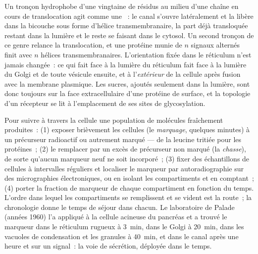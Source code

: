 \begin{proposition}\label{prop:b3:membrane-traffic:topology}
Un tronçon hydrophobe d'une vingtaine de résidus au milieu d'une chaîne
en cours de translocation agit comme une \emph{}~: le canal s'ouvre latéralement et la libère dans la
bicouche sous forme d'hélice transmembranaire, la part déjà transloquée
restant dans la lumière et le reste se faisant dans le cytosol. Un
second tronçon de ce genre relance la translocation, et une protéine
munie de $n$ signaux alternés finit avec $n$ hélices
transmembranaires. L'orientation fixée dans le réticulum n'est jamais
changée~: ce qui fait face à la lumière du réticulum fait face à la
lumière du Golgi et de toute vésicule ensuite, et à l'\emph{extérieur}
de la cellule après fusion avec la membrane plasmique. Les sucres,
ajoutés seulement dans la lumière, sont donc toujours sur la face
extracellulaire d'une protéine de surface, et la topologie d'un
récepteur se lit à l'emplacement de ses sites de glycosylation.
\end{proposition}

\begin{method}\label{met:b3:membrane-traffic:pulse-chase}
Pour suivre à travers la cellule une population de molécules
fraîchement produites~: (1) exposer brièvement les cellules (le
\emph{marquage}, quelques minutes) à un précurseur radioactif ou
autrement marqué --- de la leucine tritiée pour les protéines~;
(2) le remplacer par un excès de précurseur non marqué (la
\emph{chasse}), de sorte qu'aucun marqueur neuf ne soit incorporé~;
(3) fixer des échantillons de cellules à intervalles réguliers et
localiser le marqueur par autoradiographie sur des micrographies
électroniques, ou en isolant les compartiments et en comptant~;
(4) porter la fraction de marqueur de chaque compartiment en fonction
du temps. L'ordre dans lequel les compartiments se remplissent et se
vident est la route~; la chronologie donne le temps de séjour dans
chacun. Le laboratoire de Palade (années 1960) l'a appliqué à la
cellule acineuse du pancréas et a trouvé le marqueur dans le réticulum
rugueux à \qty{3}{min}, dans le Golgi à \qty{20}{min}, dans les
vacuoles de condensation et les granules à \qty{40}{min}, et dans le
canal après une heure et sur un signal~: la voie de sécrétion, déployée
dans le temps.
\end{method}

